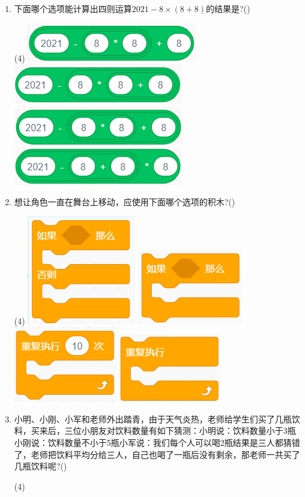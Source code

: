 \documentclass[10pt, a4paper]{article}
\begin{document}
\begin{enumerate}
        \item 下面哪个选项能计算出四则运算$2021-8\times (8+8)$的结果是?(\qquad)
        \begin{tasks}(4)
            \task \includegraphics[width=.18\textwidth]{6a.png}
            \task \includegraphics[width=.18\textwidth]{6b.png}
            \task \includegraphics[width=.18\textwidth]{6c.png}
            \task \includegraphics[width=.18\textwidth]{6d.png}
        \end{tasks}

        \item 想让角色一直在舞台上移动，应使用下面哪个选项的积木?(\qquad)
        \begin{tasks}(4)
            \task \includegraphics[width=.1\textwidth]{7a.png}
            \task \includegraphics[width=.12\textwidth]{7b.png}
            \task \includegraphics[width=.12\textwidth]{7c.png}
            \task \includegraphics[width=.12\textwidth]{7d.png}
        \end{tasks}

       \item 小明、小刚、小军和老师外出踏青，由于天气炎热，老师给学生们买了几瓶饮料，买来后，三位小朋友对饮料数量有如下猜测：小明说：饮料数量小于3瓶小刚说：饮料数量不小于5瓶小军说：我们每个人可以喝2瓶结果是三人都猜错了，老师把饮料平均分给三人，自己也喝了一瓶后没有剩余，那老师一共买了几瓶饮料呢?(\qquad)
       \begin{tasks}(4)
       \end{tasks}


\end{enumerate}
\end{document}
